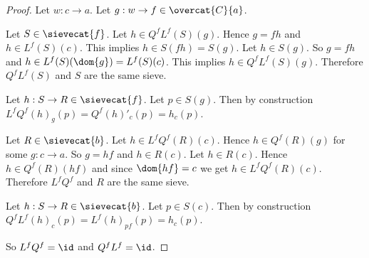\begin{proof}
Let $w: c \rightarrow a$.
Let $g:w \rightarrow f \in \overcat{C}{a}$.

Let $S\in \sievecat{f}$.
Let $h\in Q^fL^f(S)(g)$.
Hence $g=fh$ and $h\in L^f(S)(c)$.
This implies $h\in S(fh) = S(g)$.
Let $h\in S(g)$.
So $g=fh$ and $h \in L^f(S)(\dom{g})= L^f(S)(c)$.
This implies $h\in Q^fL^f(S)(g)$.
Therefore $Q^fL^f(S)$ and $S$ are the same sieve.

Let $h:S \rightarrow R \in \sievecat{f}$.
Let $p \in S(g)$.
Then by construction $L^fQ^f(h)_g(p) = Q^f(h)'_{c}(p) = h_{c}(p)$.

Let $R\in \sievecat{b}$.
Let $h\in L^fQ^f(R)(c)$.
Hence $h\in Q^f(R)(g)$ for some $g:c\rightarrow a$.
So $g=hf$ and $h\in R(c)$.
Let $h\in R(c)$.
Hence $h\in Q^f(R)(hf)$ and since $\dom{hf} = c$ we get $h\in L^fQ^f(R)(c)$.
Therefore $L^fQ^f$ and $R$ are the same sieve.

Let $h:S \rightarrow R \in \sievecat{b}$.
Let $p \in S(c)$.
Then by construction $Q^fL^f(h)_{c}(p) = L^f(h)_{pf}(p) = h_{c}(p)$.

So $L^fQ^f = \id$ and $Q^fL^f = \id$.
\end{proof}

